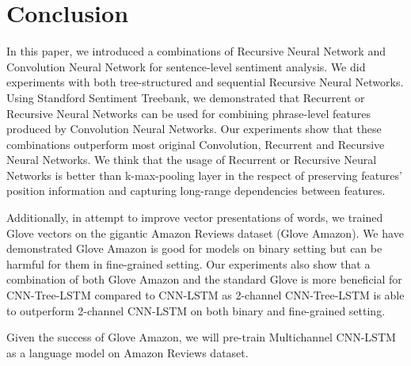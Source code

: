 \section{Conclusion}
In this paper, we introduced a combinations of Recursive Neural Network and Convolution Neural Network for sentence-level sentiment analysis.
We did experiments with both tree-structured and sequential Recursive Neural Networks.
Using Standford Sentiment Treebank, we demonstrated that Recurrent or Recursive Neural Networks can be used for combining phrase-level features produced by Convolution Neural Networks.
Our experiments show that these combinations outperform most original Convolution, Recurrent and Recursive Neural Networks. 
We think that the usage of Recurrent or Recursive Neural Networks is better than k-max-pooling layer in the respect of preserving features' position information and capturing long-range dependencies between features. 

Additionally, in attempt to improve vector presentations of words, we trained Glove vectors on the gigantic Amazon Reviews dataset (Glove Amazon).
We have demonstrated Glove Amazon is good for models on binary setting but can be harmful for them in fine-grained setting.
Our experiments also show that a combination of both Glove Amazon and the standard Glove is more beneficial for CNN-Tree-LSTM compared to CNN-LSTM as 2-channel CNN-Tree-LSTM is able to outperform 2-channel CNN-LSTM on both binary and fine-grained setting.

Given the success of Glove Amazon, we will pre-train Multichannel CNN-LSTM as a language model on Amazon Reviews dataset.

